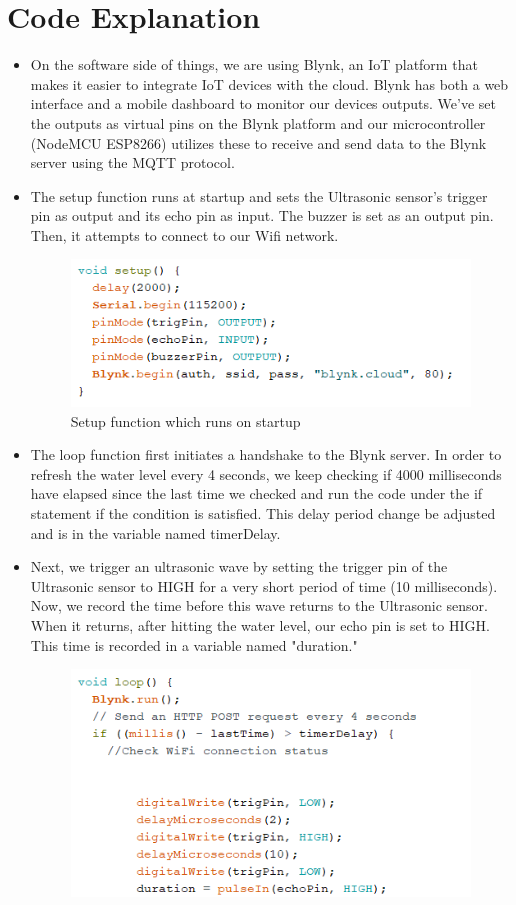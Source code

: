 \documentclass[12pt]{article}
\begin{document}
\section*{Code Explanation}
\begin{itemize}
\item On the software side of things, we are using Blynk, an IoT platform that makes it easier to integrate IoT devices with the cloud. Blynk has both a web interface and a mobile dashboard to monitor our devices outputs. We've set the outputs as virtual pins on the Blynk platform and our microcontroller (NodeMCU ESP8266) utilizes these to receive and send data to the Blynk server using the MQTT protocol.
\item The setup function runs at startup and sets the Ultrasonic sensor's trigger pin as output and its echo pin as input. The buzzer is set as an output pin. Then, it attempts to connect to our Wifi network.
\begin{figure}[H]
\centering
    \includegraphics[scale=0.85]{setup.png}
    \caption{Setup function which runs on startup}
\end{figure}
\item The loop function first initiates a handshake to the Blynk server. In order to refresh the water level every 4 seconds, we keep checking if 4000 milliseconds have elapsed since the last time we checked and run the code under the if statement if the condition is satisfied. This delay period change be adjusted and is in the variable named timerDelay.
\item Next, we trigger an ultrasonic wave by setting the trigger pin of the Ultrasonic sensor to HIGH for a very short period of time (10 milliseconds). Now, we record the time before this wave returns to the Ultrasonic sensor. When it returns, after hitting the water level, our echo pin is set to HIGH. This time is recorded in a variable named "duration."
\begin{figure}[H]
\centering
    \includegraphics[scale=0.85]{loop1.png}

\end{figure}
\end{itemize}
\end{document}
